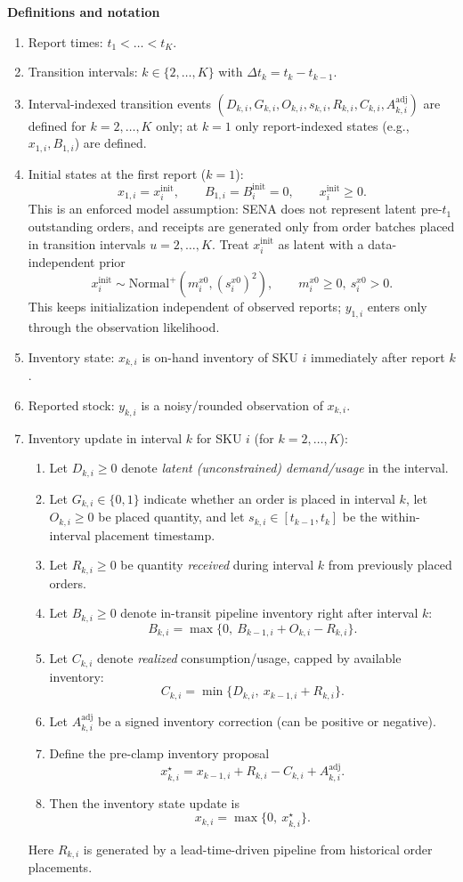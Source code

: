 \documentclass[11pt]{article}
\begin{document}
\textbf{Definitions and notation}
\begin{enumerate}
  \item Report times: $t_1 < \dots < t_K$.
  \item Transition intervals: $k\in\{2,\dots,K\}$ with $\Delta t_k = t_k - t_{k-1}$.
  \item Interval-indexed transition events $(D_{k,i},G_{k,i},O_{k,i},s_{k,i},R_{k,i},C_{k,i},A^{\mathrm{adj}}_{k,i})$ are defined for $k=2,\dots,K$ only; at $k=1$ only report-indexed states (e.g., $x_{1,i},B_{1,i}$) are defined.
  \item Initial states at the first report ($k=1$):
  \[
    x_{1,i}=x^{\mathrm{init}}_i,\qquad B_{1,i}=B^{\mathrm{init}}_i=0,\qquad x^{\mathrm{init}}_i\ge 0.
  \]
  This is an enforced model assumption: SENA does not represent latent pre-$t_1$ outstanding orders, and receipts are generated only from order batches placed in transition intervals $u=2,\dots,K$.
  Treat $x^{\mathrm{init}}_i$ as latent with a data-independent prior
  \[
    x^{\mathrm{init}}_i\sim \text{Normal}^+(m^{x0}_i,(s^{x0}_i)^2),\qquad m^{x0}_i\ge 0,\ s^{x0}_i>0.
  \]
  This keeps initialization independent of observed reports; $y_{1,i}$ enters only through the observation likelihood.
  \item Inventory state: $x_{k,i}$ is on-hand inventory of SKU $i$ immediately after report $k$.
  \item Reported stock: $y_{k,i}$ is a noisy/rounded observation of $x_{k,i}$.
  \item Inventory update in interval $k$ for SKU $i$ (for $k=2,\dots,K$):
  \begin{enumerate}
    \item Let $D_{k,i}\ge 0$ denote \emph{latent (unconstrained) demand/usage} in the interval.
    \item Let $G_{k,i}\in\{0,1\}$ indicate whether an order is placed in interval $k$, let $O_{k,i}\ge0$ be placed quantity, and let $s_{k,i}\in[t_{k-1},t_k]$ be the within-interval placement timestamp.
    \item Let $R_{k,i}\ge0$ be quantity \emph{received} during interval $k$ from previously placed orders.
    \item Let $B_{k,i}\ge0$ denote in-transit pipeline inventory right after interval $k$:
    \[
      B_{k,i}=\max\bigl\{0,\ B_{k-1,i}+O_{k,i}-R_{k,i}\bigr\}.
    \]
    \item Let $C_{k,i}$ denote \emph{realized} consumption/usage, capped by available inventory:
    \[
      C_{k,i} = \min\bigl\{D_{k,i},\ x_{k-1,i} + R_{k,i}\bigr\}.
    \]
    \item Let $A^{\mathrm{adj}}_{k,i}$ be a signed inventory correction (can be positive or negative).
    \item Define the pre-clamp inventory proposal
    \[
      x^\star_{k,i} = x_{k-1,i} + R_{k,i} - C_{k,i} + A^{\mathrm{adj}}_{k,i}.
    \]
    \item Then the inventory state update is
    \[
      x_{k,i} = \max\bigl\{0,\ x^\star_{k,i}\bigr\}.
    \]
  \end{enumerate}
  Here $R_{k,i}$ is generated by a lead-time-driven pipeline from historical order placements.


\end{enumerate}
\end{document}
